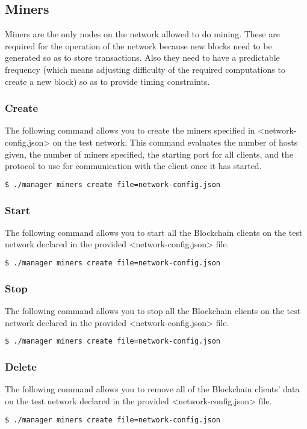 \subsection{Miners}

Miners are the only nodes on the network allowed to do mining. These are required for the operation of the network because new blocks need to be generated so as to store transactions. Also they need to have a predictable frequency (which means adjusting difficulty of the required computations to create a new block) so as to provide timing constraints.

\subsubsection{Create}

The following command allows you to create the miners specified in <network-config.json> on the test network. This command evaluates the number of hosts given, the number of miners specified, the starting port for all clients, and the protocol to use for communication with the client once it has started.
\begin{lstlisting}[language=bash]
$ ./manager miners create file=network-config.json
\end{lstlisting}

\subsubsection{Start}

The following command allows you to start all the Blockchain clients on the test network declared in the provided <network-config.json> file.
\begin{lstlisting}[language=bash]
$ ./manager miners create file=network-config.json
\end{lstlisting}


\subsubsection{Stop}
The following command allows you to stop all the Blockchain clients on the test network declared in the provided <network-config.json> file.
\begin{lstlisting}[language=bash]
$ ./manager miners create file=network-config.json
\end{lstlisting}


\subsubsection{Delete}
The following command allows you to remove all of the Blockchain clients' data on the test network declared in the provided <network-config.json> file.
\begin{lstlisting}[language=bash]
$ ./manager miners create file=network-config.json
\end{lstlisting}
